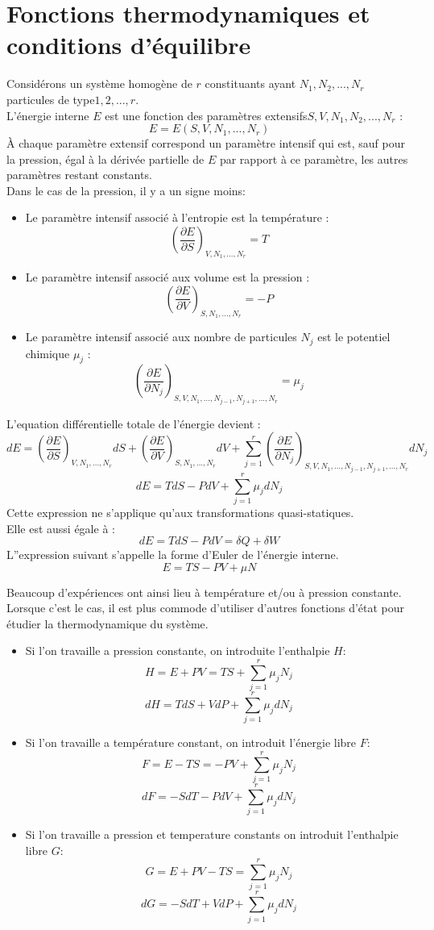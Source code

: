 \documentclass[12pt,oneside]{book}
\begin{document}
\section{Fonctions thermodynamiques et conditions d'équilibre}
Considérons un système homogène de $r$ constituants ayant $N_1, N_2,..., N_r$ particules de type$ 1,2,...,r$.\\
L'énergie interne $E$ est une fonction des paramètres extensifs$ S, V, N_1,N_2,..., N_r$ :
\[E = E(S,V,N_1,...,N_r)\]
À chaque paramètre extensif correspond un paramètre intensif qui est, sauf pour la pression, égal à la dérivée partielle de $E$ par rapport à ce paramètre, les autres paramètres restant constants. \\
Dans le cas de la pression, il y a un signe moins:
\begin{itemize}
	\item Le paramètre intensif associé à l'entropie est la température :
	      \[(\frac{\partial E}{\partial S})_{V,N_1,...,N_r} = T\]
	\item Le paramètre intensif associé aux volume est la pression :
	      \[(\frac{\partial E}{\partial V})_{S,N_1,...,N_r} = -P\]
	\item Le paramètre intensif associé aux nombre de particules $N_j$ est le potentiel chimique $\mu_j$ :
	      \[(\frac{\partial E}{\partial N_j})_{S,V,N_1,...,N_{j-1},N_{j+1},...,N_r} = \mu_j\]
\end{itemize}
L'equation différentielle totale de l'énergie devient :
\[dE = (\frac{\partial E}{\partial S})_{V,N_1,...,N_r}dS + (\frac{\partial E}{\partial V})_{S,N_1,...,N_r} dV + \sum_{j=1}^{r} (\frac{\partial E}{\partial N_j})_{S,V,N_1,...,N_{j-1},N_{j+1},...,N_r} dN_j\]
\[\boxed{dE = TdS - PdV + \sum_{j=1}^{r}\mu_jdN_j}\]
Cette expression ne s'applique qu'aux transformations quasi-statiques. \\
Elle est aussi égale à :
\[dE = TdS - PdV = \delta Q + \delta W\]
L''expression suivant s'appelle la forme d'Euler de l'énergie interne.
\[ \boxed{E = TS - PV + \mu N} \]

Beaucoup d'expériences ont ainsi lieu à température et/ou à pression constante.\\
Lorsque c'est le cas, il est plus commode d'utiliser d'autres fonctions d'état pour étudier la thermodynamique du système.
\begin{itemize}
	\item Si l'on travaille a pression constante, on introduite l'enthalpie $H$:
	      \[ H = E + PV = TS + \sum_{j=1}^r\mu_jN_j \]
	      \[ \boxed{ dH = TdS + VdP + \sum_{j=1}^r\mu_jdN_j } \]
	\item Si l'on travaille a température constant, on introduit l'énergie libre $F$:
	      \[F = E-TS = -PV +\sum_{j=1}^r\mu_jN_j\]
	      \[ \boxed{ dF = -SdT -PdV + \sum_{j=1}^r\mu_jdN_j } \]
	\item Si l'on travaille a pression et temperature constants on introduit l'enthalpie libre $G$:
	      \[G = E + PV -TS = \sum_{j=1}^r\mu_jN_j\]
	      \[ \boxed{dG = -SdT + VdP + \sum_{j=1}^r\mu_jdN_j} \]
\end{itemize}
\end{document}
